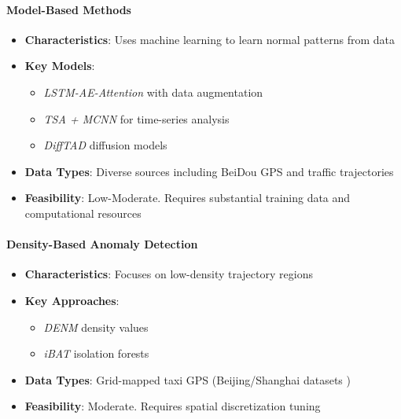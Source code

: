 \documentclass[runningheads]{llncs}
\newcommand{\term}[1]{\textit{#1}}
\begin{document}
\paragraph{Model-Based Methods}
\label{par:model-methods}

\begin{itemize}[label=•]
\item \textbf{Characteristics}: Uses machine learning to learn normal patterns from data
\item \textbf{Key Models}:
  \begin{itemize}[label=--]
  \item \term{LSTM-AE-Attention} with data augmentation \cite{huang2021vehicle}
  \item \term{TSA + MCNN} for time-series analysis \cite{zhao2021research}
  \item \term{DiffTAD} diffusion models \cite{LI2024111387}
  \end{itemize}
\item \textbf{Data Types}: Diverse sources including BeiDou GPS \cite{zhao2021research} and traffic trajectories
\item \textbf{Feasibility}: Low-Moderate. Requires substantial training data and computational resources \cite{huang2021vehicle}
\end{itemize}

\paragraph{Density-Based Anomaly Detection}
\label{par:density-methods}

\begin{itemize}[label=•]
\item \textbf{Characteristics}: Focuses on low-density trajectory regions
\item \textbf{Key Approaches}:
  \begin{itemize}[label=--]
  \item \term{DENM} density values \cite{he2019based}
  \item \term{iBAT} isolation forests \cite{zhang2011ibat}
  \end{itemize}
\item \textbf{Data Types}: Grid-mapped taxi GPS (Beijing/Shanghai datasets \cite{he2019based})
\item \textbf{Feasibility}: Moderate. Requires spatial discretization tuning \cite{zhang2011ibat}
\end{itemize}
\end{document}
